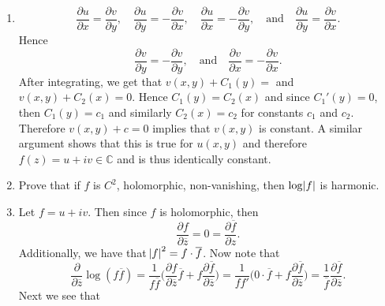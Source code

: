 \documentclass[12pt]{article}
\makeatletter
\theoremstyle{definition}
\theoremstyle{remark}
\renewenvironment{proof}[1][\proofname]{\par
  \pushQED{\qed}%
  \normalfont \topsep6\p@\@plus6\p@\relax
  \list{}{\leftmargin=0mm
          \rightmargin=4mm
          \settowidth{\itemindent}{\itshape#1}%
          \labelwidth=\itemindent
          \parsep=0pt \listparindent=\parindent 
  }
  \item[\hskip\labelsep
        \itshape
    #1\@addpunct{.}]\ignorespaces
}{%
  \popQED\endlist\@endpefalse
}
\let\oldproofname=\proofname
\renewcommand{\proofname}{\bf{\textit{\oldproofname}}}
\makeatother
\begin{document}
\begin{enumerate}[leftmargin=*]
\begin{proof}
                    \begin{equation*}
                        \frac{\partial u}{\partial x}=\frac{\partial v}{\partial y},\quad\frac{\partial u}{\partial y}=-\frac{\partial v}{\partial x},\quad \frac{\partial u}{\partial x}=-\frac{\partial v}{\partial y},\quad\text{and}\quad\frac{\partial u}{\partial y}=\frac{\partial v}{\partial x}.
                    \end{equation*}
                Hence
                    \begin{equation*}
                        \frac{\partial v}{\partial y}=-\frac{\partial v}{\partial y},\quad\text{and}\quad\frac{\partial v}{\partial x}=-\frac{\partial v}{\partial x}.
                    \end{equation*}
                After integrating, we get that $v(x,y)+C_1(y)=$ and $v(x,y)+C_2(x)=0$. Hence $C_1(y)=C_2(x)$ and since $C_1'(y)=0$, then $C_1(y)=c_1$ and similarly $C_2(x)=c_2$ for constants $c_1$ and $c_2$. Therefore $v(x,y)+c=0$ implies that $v(x,y)$ is constant. A similar argument shows that this is true for $u(x,y)$ and therefore $f(z)=u+iv\in\mathbb{C}$ and is thus identically constant.
            \end{proof}
        \item Prove that if $f$ is $C^2$, holomorphic, non-vanishing, then $\log\abs{f}$ is harmonic. 
            \begin{proof}
                Let $f=u+iv$. Then since $f$ is holomorphic, then 
                    \begin{equation*}
                        \frac{\partial f}{\partial\overline{z}}=0=\frac{\partial\overline{f}}{\partial z}.
                    \end{equation*}
                Additionally, we have that $\abs{f}^2=f\cdot\overline{f}$. Now note that 
                    \begin{equation*}
                        \frac{\partial}{\partial\overline{z}}\log(f\overline{f})=\frac{1}{f\overline{f}}\bigg(\frac{\partial f}{\partial\overline{z}}\overline{f}+f\frac{\partial\overline{f}}{\partial\overline{z}}\bigg)=\frac{1}{ff'}\bigg(0\cdot\overline{f}+f\frac{\partial\overline{f}}{\partial\overline{z}}\bigg)=\frac{1}{\overline{f}}\frac{\partial\overline{f}}{\partial\overline{z}}.
                    \end{equation*}
                Next we see that 
                    \begin{equation*}
                        \begin{split}

\end{split}
\end{equation*}
\end{proof}
\end{enumerate}
\end{document}

